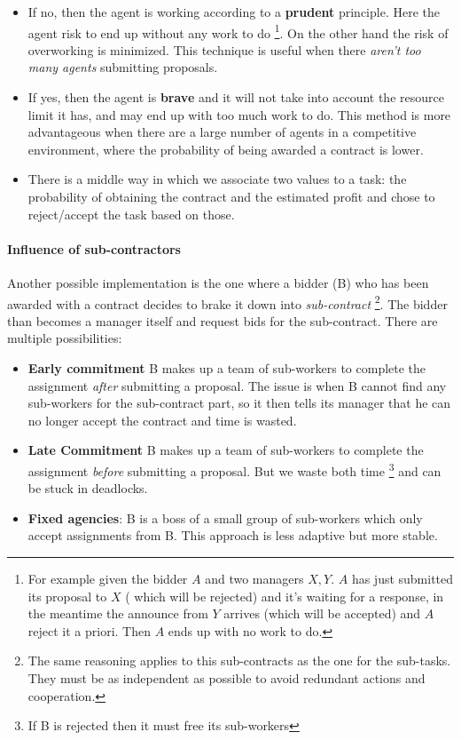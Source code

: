 \documentclass[10pt,a4paper]{article}
\begin{document}
\begin{itemize}
\item If no, then the agent is working according to a \textbf{prudent} principle. Here the agent risk to end up without any work to do \footnote{For example given the bidder $A$ and two managers $X,Y$. $A$ has just submitted its proposal to $X$ ( which will be rejected) and it's waiting for a response, in the meantime the announce from $Y$ arrives (which will be accepted) and $A$ reject it a priori. Then $A$ ends up with no work to do. }. On the other hand the risk of overworking is minimized. This technique is useful when there \textit{aren't too many agents} submitting proposals.

\item If yes, then the agent is \textbf{brave} and it will not take into account the resource limit it has, and may end up with too much work to do. This method is more advantageous when there are a large number of agents in a competitive environment, where the probability of being awarded a contract is lower.

\item There is a middle way in which we associate two values to a task: the probability of obtaining the contract and the estimated profit and chose to reject/accept the task based on those.
\end{itemize}



\paragraph{Influence of sub-contractors}
Another possible implementation is the one where a bidder (B) who has been awarded with a contract decides to brake it down into \textit{sub-contract} \footnote{The same reasoning applies to this sub-contracts as the one for the sub-tasks. They must be as independent as possible to avoid redundant actions and cooperation.}. The bidder than becomes a manager itself and request bids for the sub-contract. There are multiple possibilities:
\begin{itemize}
\item \textbf{Early commitment} B makes up a team of sub-workers to complete the assignment \textit{after} submitting a proposal. The issue is when B cannot find any sub-workers for the sub-contract part, so it then tells its manager that he can no longer accept the contract and time is wasted.
\item \textbf{Late Commitment} B makes up a team of sub-workers to complete the assignment \textit{before} submitting a proposal. But we waste both time \footnote{If B is rejected then it must free its sub-workers} and can be stuck in deadlocks.
\item \textbf{Fixed agencies}: B is a boss of a small group of sub-workers which only accept assignments from B. This approach is less adaptive but more stable.
\end{itemize}
\end{document}
